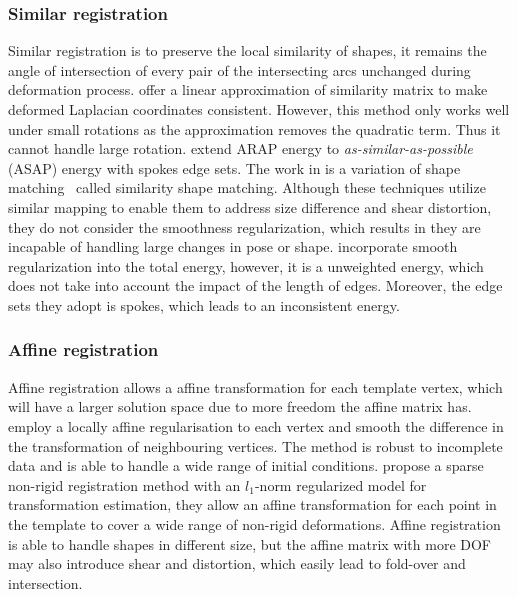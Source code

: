 \subsubsection{Similar registration}
Similar registration is to preserve the local similarity of shapes, it remains the angle of intersection of every pair of the intersecting arcs unchanged during deformation process. \cite{sorkine2004laplacian} offer a linear approximation of similarity matrix to make deformed Laplacian coordinates consistent. However, this method only works well under small rotations as the approximation removes the quadratic term. Thus it cannot handle large rotation. \cite{yamazaki2013non} extend ARAP energy to \emph{as-similar-as-possible} (ASAP) energy with spokes edge sets. The work in \citep{papazov2011deformable} is a variation of shape matching~\citep{muller2005meshless} called similarity shape matching. Although these techniques utilize similar mapping to enable them to address size difference and shear distortion, they do not consider the smoothness regularization, which results in they are incapable of handling large changes in pose or shape. \cite{yoshiyasu2014conformal} incorporate smooth regularization into the total energy, however, it is a unweighted energy, which does not take into account the impact of the length of edges. Moreover, the edge sets they adopt is spokes, which leads to an inconsistent energy.

\subsubsection{Affine registration}
Affine registration allows a affine transformation for each template vertex, which will have a larger solution space due to more freedom the affine matrix has. \cite{amberg2007optimal} employ a locally affine regularisation to each vertex and smooth the difference in the transformation of neighbouring vertices. The method is robust to incomplete data and is able to handle a wide range of initial conditions. \cite{yang2015sparse} propose a sparse non-rigid registration method with an $l_1$-norm regularized model for transformation estimation, they allow an affine transformation for each point in the template to cover a wide range of non-rigid deformations. Affine registration is able to handle shapes in different size, but the affine matrix with more DOF may also introduce shear and distortion, which easily lead to fold-over and intersection.


